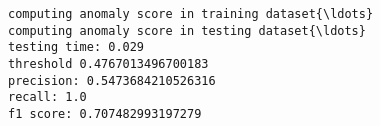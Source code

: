 \documentclass[11pt]{article}
\begin{document}
    \begin{Verbatim}[commandchars=\\\{\}]
computing anomaly score in training dataset{\ldots}
computing anomaly score in testing dataset{\ldots}
testing time: 0.029
threshold 0.4767013496700183
precision: 0.5473684210526316
recall: 1.0
f1 score: 0.707482993197279

    \end{Verbatim}

    \begin{center}
    \end{center}
    { \hspace*{\fill} \\}
    
    \begin{center}
    \end{center}
    { \hspace*{\fill} \\}
    

    
    
    
    
\end{document}
